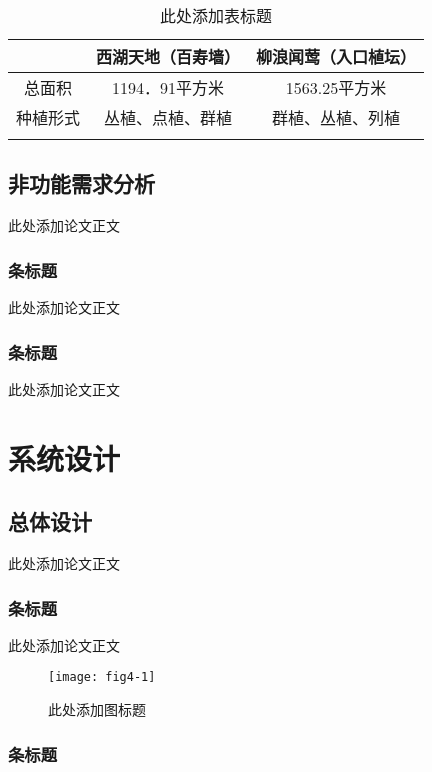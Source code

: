 \documentclass{article}
\begin{document}
\begin{table}[H]
\centering
\caption{此处添加表标题}\label{tab1-1}
\begin{tabular}{!{\vrule width1.2pt}c|c|c!{\vrule width1.2pt}}
\Xhline{1.2pt}
 & 西湖天地（百寿墙） & 柳浪闻莺（入口植坛）\\ \hline
总面积 & 1194．91平方米 & 1563.25平方米\\ \hline
种植形式 & 丛植、点植、群植  & 群植、丛植、列植\\ \Xhline{1.2pt}
\end{tabular}
\end{table}


\subsection{非功能需求分析}
此处添加论文正文

\subsubsection{条标题}
此处添加论文正文

\subsubsection{条标题}
此处添加论文正文


\section{系统设计 }

\subsection{总体设计}
此处添加论文正文

\subsubsection{条标题}
此处添加论文正文

\begin{figure}[H]
\centering
\texttt{[image: fig4-1]}
\caption{此处添加图标题}\label{fig4-1}
\end{figure}

\subsubsection{条标题}
\end{document}
